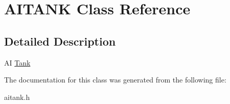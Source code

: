 \hypertarget{class_a_i_t_a_n_k}{}\section{A\+I\+T\+A\+NK Class Reference}
\label{class_a_i_t_a_n_k}


\subsection{Detailed Description}
AI \mbox{\hyperlink{class_tank}{Tank}} 

The documentation for this class was generated from the following file\+:\begin{DoxyCompactItemize}
\item 
aitank.\+h\end{DoxyCompactItemize}
